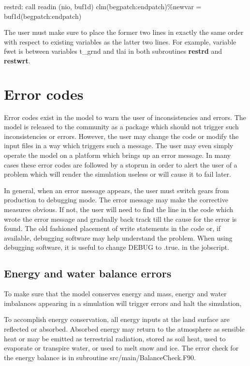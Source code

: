 \documentclass[]{article}
\begin{document}
\noindent 
\newline restrd: 
\newline call readin (nio, buf1d)
\newline clm(begpatch:endpatch)\%newvar = buf1d(begpatch:endpatch)
\newline

\noindent 
The user must make sure to place the former two lines in exactly the
same order with respect to existing variables as the latter two
lines. For example, variable fwet is between variables t\_grnd and
tlai in both subroutines {\bf restrd} and {\bf restwrt}.

\section{Error codes}

Error codes exist in the model to warn the user of inconsistencies and
errors. The model is released to the community as a package which
should not trigger such inconsistencies or errors. However, the user
may change the code or modify the input files in a way which triggers
such a message. The user may even simply operate the model on a
platform which brings up an error message. In many cases these error
codes are followed by a stoprun in order to alert the user of a
problem which will render the simulation useless or will cause it to
fail later.

In general, when an error message appears, the user must switch gears
from production to debugging mode. The error message may make the
corrective measures obvious. If not, the user will need to find the
line in the code which wrote the error message and gradually back
track till the cause for the error is found. The old fashioned
placement of write statements in the code or, if available, debugging
software may help understand the problem. When using debugging
software, it is useful to change DEBUG to .true. in the jobscript.

\subsection {Energy and water balance errors}

To make sure that the model conserves energy and mass, energy and
water imbalances appearing in a simulation will trigger errors and
halt the simulation,

To accomplish energy conservation, all energy inputs at the land
surface are reflected or absorbed. Absorbed energy may return to the
atmosphere as sensible heat or may be emitted as terrestrial
radiation, stored as soil heat, used to evaporate or transpire water,
or used to melt snow and ice. The error check for the energy balance
is in subroutine src/main/BalanceCheck.F90.
\end{document}
